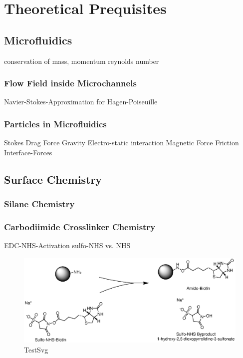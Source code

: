 \chapter{Theoretical Prequisites}

\section{Microfluidics}
conservation of mass, momentum
reynolds number
\subsection{Flow Field inside Microchannels}
Navier-Stokes-Approximation for Hagen-Poiseuille
\subsection{Particles in Microfluidics}
Stokes Drag Force
Gravity
Electro-static interaction
Magnetic Force
Friction
Interface-Forces
\subsection{}

\section{Surface Chemistry}
\subsection{Silane Chemistry}
\subsection{Carbodiimide Crosslinker Chemistry}
EDC-NHS-Activation
sulfo-NHS vs. NHS
\begin{figure}[hbtp]
\centering
\includegraphics[width=\textwidth]{./Ressources/Chemistry/Sulfo-NHS.eps}
\caption{TestSvg}
\label{fig:Chem:NH2-NHS}
\end{figure}

